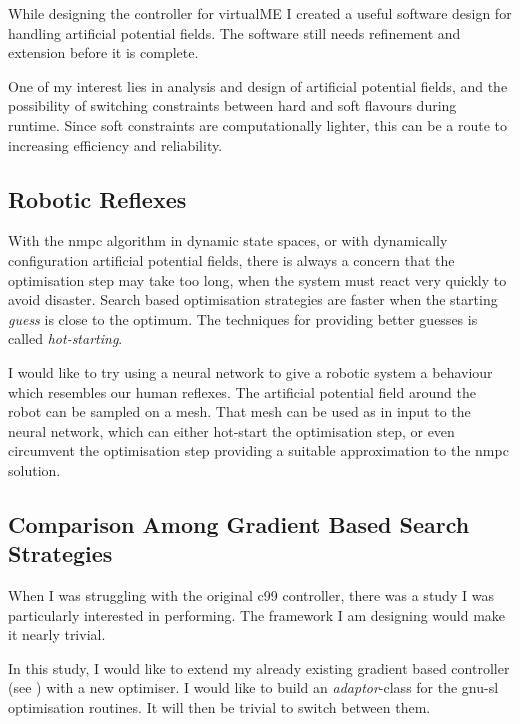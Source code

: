 While designing the controller for virtualME I created a useful
software design for handling artificial potential fields. The software still
needs refinement and extension before it is complete.

One of my interest lies in analysis and design of artificial potential fields,
and the possibility of switching constraints between hard and soft flavours
during runtime. Since soft constraints are computationally lighter, this can be
a route to increasing efficiency and reliability.


\subsection{Robotic Reflexes}

With the \ac{nmpc} algorithm in dynamic state spaces, or with dynamically
configuration artificial potential fields, there is always a concern that the
optimisation step may take too long, when the system must react very quickly to
avoid disaster. Search based optimisation strategies are faster when the
starting \emph{guess} is close to the optimum. The techniques for providing
better guesses is called \emph{hot-starting}.

I would like to try using a neural network to give a robotic system a behaviour
which resembles our human reflexes. The artificial potential field around the
robot can be sampled on a mesh. That mesh can be used as in input to the neural
network, which can either hot-start the optimisation step, or even circumvent
the optimisation step providing a suitable approximation to the \ac{nmpc}
solution.


\subsection{Comparison Among Gradient Based Search Strategies}

When I was struggling with the original \ac{c99} controller, there was a study I
was particularly interested in performing. The framework I am designing would
make it nearly trivial.

In this study, I would like to extend my already existing gradient based
controller (see ) with a new optimiser. I would like to
build an \emph{adaptor}-class for the \ac{gnu-sl} optimisation routines. It will
then be trivial to switch between them.

